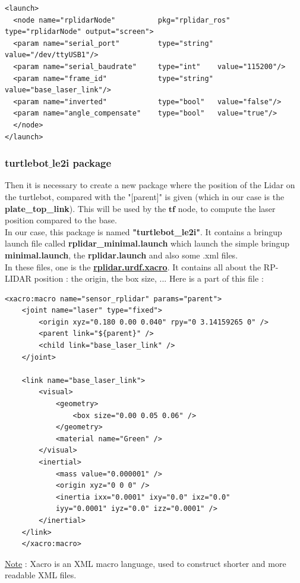 \documentclass[10pt,a4paper]{article}
\begin{document}
\begin{lstlisting}[frame=single] 
<launch>
  <node name="rplidarNode"          pkg="rplidar_ros"  type="rplidarNode" output="screen">
  <param name="serial_port"         type="string" value="/dev/ttyUSB1"/>  
  <param name="serial_baudrate"     type="int"    value="115200"/>
  <param name="frame_id"            type="string" value="base_laser_link"/>
  <param name="inverted"            type="bool"   value="false"/>
  <param name="angle_compensate"    type="bool"   value="true"/>
  </node>
</launch>
\end{lstlisting}


\subsubsection{turtlebot$\_$le2i package}


Then it is necessary to create a new package where the position of the Lidar on the turtlebot, compared with the "[parent]" is given (which in our case is the \textbf{plate\_top\_link}). This will be used by the  $\textbf{tf}$ node, to compute the laser position compared to the base. \\
In our case, this package is named \textbf{"turtlebot\_le2i"}. It contains a bringup launch file called \textbf{rplidar\_minimal.launch} which launch the simple bringup \textbf{minimal.launch}, the \textbf{rplidar.launch} and also some .xml files. \\
In these files, one is the \textbf{\underline{rplidar.urdf.xacro}}.
It contains all about the RP-LIDAR position : the origin, the box size, ...  Here is a part of this file : 

\begin{lstlisting}[frame=single] 
	<xacro:macro name="sensor_rplidar" params="parent">
  	<joint name="laser" type="fixed">
		<origin xyz="0.180 0.00 0.040" rpy="0 3.14159265 0" />
		<parent link="${parent}" />
		<child link="base_laser_link" />
	</joint>

	<link name="base_laser_link">
		<visual>
			<geometry>
				<box size="0.00 0.05 0.06" />
			</geometry>
			<material name="Green" />
		</visual>
		<inertial>
			<mass value="0.000001" />
			<origin xyz="0 0 0" />
			<inertia ixx="0.0001" ixy="0.0" ixz="0.0"
			iyy="0.0001" iyz="0.0" izz="0.0001" />
		</inertial>
	</link>
	</xacro:macro>
\end{lstlisting}
\underline{Note} : Xacro is an XML macro language, used to construct shorter and more readable XML files.
\end{document}
